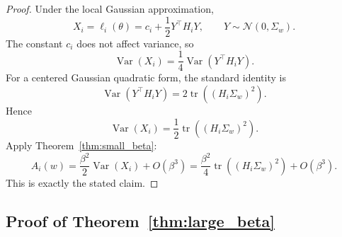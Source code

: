 \documentclass{article}
\newcommand{\Var}{\operatorname{Var}}
\newcommand{\tr}{\operatorname{tr}}
\begin{document}
\begin{proof}
Under the local Gaussian approximation,
\begin{equation}
    X_i = \ell_i(\theta)
    =
    c_i + \frac{1}{2} Y^\top H_i Y,
    \qquad Y \sim \mathcal{N}(0,\Sigma_w).
\end{equation}
The constant \(c_i\) does not affect variance, so
\begin{equation}
    \Var(X_i)
    =
    \frac{1}{4}\Var(Y^\top H_i Y).
\end{equation}
For a centered Gaussian quadratic form, the standard identity is
\begin{equation}
    \Var(Y^\top H_i Y)
    =
    2\tr\!\left((H_i\Sigma_w)^2\right).
\end{equation}
Hence
\begin{equation}
    \Var(X_i)
    =
    \frac{1}{2}\tr\!\left((H_i\Sigma_w)^2\right).
\end{equation}
Apply Theorem~\ref{thm:small_beta}:
\begin{equation}
    A_i(w)
    =
    \frac{\beta^2}{2}\Var(X_i) + O(\beta^3)
    =
    \frac{\beta^2}{4}\tr\!\left((H_i\Sigma_w)^2\right)+O(\beta^3).
\end{equation}
This is exactly the stated claim. \qedhere
\end{proof}

\subsection{Proof of Theorem~\ref{thm:large_beta}}
\end{document}
